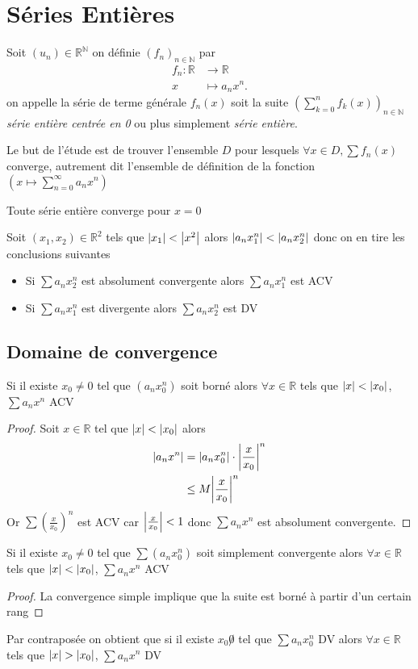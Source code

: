 \documentclass[11pt,colorlinks]{book}
\theoremstyle{mytheoremstyle}
\theoremstyle{mytheoremstyle}
\theoremstyle{mytheoremstyle}
\theoremstyle{mytheoremstyle}
\theoremstyle{mytheoremstyle}
\theoremstyle{mytheoremstyle}
\theoremstyle{mytheoremstyle}
\theoremstyle{mytheoremstyle}
\theoremstyle{myproblemstyle}
\def\mbb#1{\mathbb{#1}}
\def\bN{\mbb{N}}
\def\bR{\mbb{R}}
\def\rN{\bR^{\bN}}
\def\apcr{à partir d'un certain rang}
\newcommand{\vfunc}[5]{
  \begin{align*}
    #1 \colon #2 &\to #3\\
    #4 &\mapsto #5.
  \end{align*}
}
\begin{document}
\chapter{Séries Entières}
\begin{definition}
  Soit $(u_n) \in \rN$ on définie $(f_n)_{n\in\bN}$ par \vfunc{f_n}{\bR}{\bR}{x}{a_nx^n} on appelle la série de terme générale $f_n(x)$ 
  soit la suite $\left(\sum_{k=0}^n f_k(x)\right)_{n\in \bN}$ \textit{série entière centrée en 0} ou plus simplement \textit{série entière}.\newline

  Le but de l'étude est de trouver l'ensemble $D$ pour lesquels $\forall x \in D, \sum f_n(x)$ converge, autrement dit 
  l'ensemble de définition de la fonction $\left(x \mapsto \sum_{n=0}^{\infty} a_n x^n\right)$ 
\end{definition}
\begin{rmq}
  Toute série entière converge pour $x=0$
\end{rmq}
\begin{rmq}
  Soit $(x_1,x_2) \in \bR^2$ tels que $\abs{x_1} < \abs{x^2}$ alors $\abs{a_nx_1^n} < \abs{a_nx_2^n}$ donc on en tire les conclusions suivantes 
  \begin{itemize}
    \item Si $\sum a_n x_2^n$ est absolument convergente alors $\sum a_n x_1^n$ est ACV 
    \item Si $\sum a_n x_1^n$ est divergente alors $\sum a_nx_2^n$ est DV
  \end{itemize}
\end{rmq}
\section{Domaine de convergence}
\begin{theorem}
  Si il existe $x_0 \not=0$ tel que $(a_nx_0^n)$ soit borné alors $\forall x \in \bR$ tels que $\abs{x} < \abs{x_0}$, $\sum a_n x^n$ ACV 
  \begin{proof}
    Soit $x \in \bR$ tel que $\abs{x} < \abs{x_0}$ alors 
    \begin{align*}
      \abs{a_nx^n} &= \abs{a_nx_0^n} \cdot \abs{\frac{x}{x_0}}^n \\ 
      &\leq M \abs{\frac{x}{x_0}}^n
    \end{align*}
    Or $\sum \left(\frac{x}{x_0}\right)^n$ est ACV car $\abs{\frac{x}{x_0}} < 1$ donc $\sum a_n x^n$ est absolument convergente.
  \end{proof} 
\end{theorem}
\begin{rmq}
  Si il existe $x_0 \not=0$ tel que $\sum (a_nx_0^n)$ soit simplement convergente alors $\forall x \in \bR$ tels que $\abs{x} < \abs{x_0}$, $\sum a_n x^n$ ACV 
  \begin{proof}
    La convergence simple implique que la suite est borné \apcr
  \end{proof}
\end{rmq}
\begin{rmq}
  Par contraposée on obtient que si il existe $x_0 \not 0$ tel que $\sum a_n x_0^n$ DV alors $\forall x \in \bR$ tels que $\abs{x} > \abs{x_0}$, $\sum a_n x^n$ DV
\end{rmq}
\end{document}
